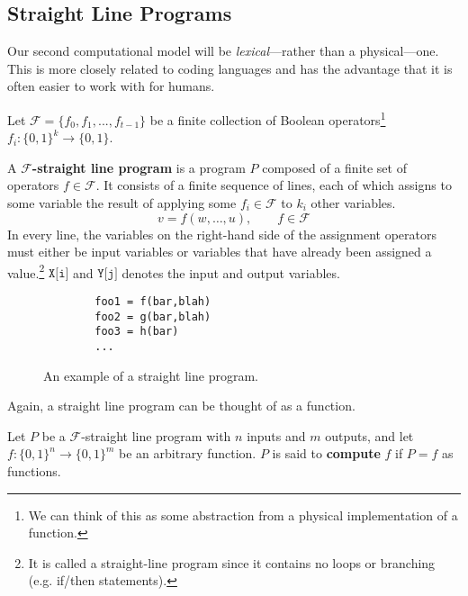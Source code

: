\subsection{Straight Line Programs}

  Our second computational model will be \textit{lexical}---rather than a physical---one. This is more closely related to coding languages and has the advantage that it is often easier to work with for humans. 

  \begin{definition}
    Let $\mathcal{F} = \{f_0, f_1, ..., f_{t-1}\}$ be a finite collection of Boolean operators\footnote{We can think of this as some abstraction from a physical implementation of a function.} $f_i: \{0,1\}^k \longrightarrow \{0,1\}$. 

    A \textbf{$\mathcal{F}$-straight line program} is a program $P$ composed of a finite set of operators $f \in \mathcal{F}$. It consists of a finite sequence of lines, each of which assigns to some variable the result of applying some $f_i \in \mathcal{F}$ to $k_i$ other variables. 
    \begin{equation}
      v = f(w, \ldots, u), \qquad f \in \mathcal{F} 
    \end{equation}
    In every line, the variables on the right-hand side of the assignment operators must either be input variables or variables that have already been assigned a value.\footnote{It is called a straight-line program since it contains no loops or branching (e.g. if/then statements). } 
    $\texttt{X[i]}$ and $\texttt{Y[j]}$ denotes the input and output variables. 

    \begin{figure}[H]
      \centering 
      \begin{lstlisting}
        foo1 = f(bar,blah)
        foo2 = g(bar,blah)
        foo3 = h(bar)
        ...
      \end{lstlisting}
      \caption{An example of a straight line program. } 
      \label{fig:straight-line}
    \end{figure}
  \end{definition}

  Again, a straight line program can be thought of as a function. 

  \begin{definition}
    Let $P$ be a $\mathcal{F}$-straight line program with $n$ inputs and $m$ outputs, and let $f: \{0, 1\}^n \to \{0, 1\}^m$ be an arbitrary function. $P$ is said to \textbf{compute} $f$ if $P = f$ as functions. 
  \end{definition}

